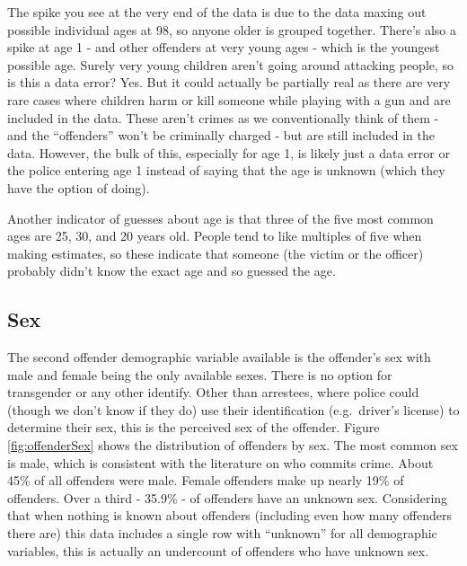 \documentclass[
  12pt,
  openany]{book}
\begin{document}
The spike you see at the very end of the data is due to the data maxing out possible individual ages at 98, so anyone older is grouped together. There's also a spike at age 1 - and other offenders at very young ages - which is the youngest possible age. Surely very young children aren't going around attacking people, so is this a data error? Yes. But it could actually be partially real as there are very rare cases where children harm or kill someone while playing with a gun and are included in the data. These aren't crimes as we conventionally think of them - and the ``offenders'' won't be criminally charged - but are still included in the data. However, the bulk of this, especially for age 1, is likely just a data error or the police entering age 1 instead of saying that the age is unknown (which they have the option of doing).

Another indicator of guesses about age is that three of the five most common ages are 25, 30, and 20 years old. People tend to like multiples of five when making estimates, so these indicate that someone (the victim or the officer) probably didn't know the exact age and so guessed the age.

\subsection{Sex}\label{sex-1}

The second offender demographic variable available is the offender's sex with male and female being the only available sexes. There is no option for transgender or any other identify. Other than arrestees, where police could (though we don't know if they do) use their identification (e.g.~driver's license) to determine their sex, this is the perceived sex of the offender. Figure \ref{fig:offenderSex} shows the distribution of offenders by sex. The most common sex is male, which is consistent with the literature on who commits crime. About 45\% of all offenders were male. Female offenders make up nearly 19\% of offenders. Over a third - 35.9\% - of offenders have an unknown sex. Considering that when nothing is known about offenders (including even how many offenders there are) this data includes a single row with ``unknown'' for all demographic variables, this is actually an undercount of offenders who have unknown sex.
\end{document}
